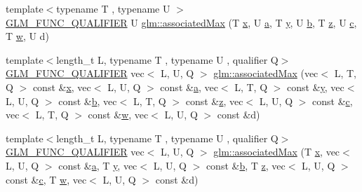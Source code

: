 \begin{DoxyCompactItemize}
\item 
{\footnotesize template$<$typename T , typename U $>$ }\\\mbox{\hyperlink{setup_8hpp_a33fdea6f91c5f834105f7415e2a64407}{G\+L\+M\+\_\+\+F\+U\+N\+C\+\_\+\+Q\+U\+A\+L\+I\+F\+I\+ER}} U \mbox{\hyperlink{group__gtx__associated__min__max_ga3038ffcb43eaa6af75897a99a5047ccc}{glm\+::associated\+Max}} (T \mbox{\hyperlink{_s_d_l__opengl_8h_ad0e63d0edcdbd3d79554076bf309fd47}{x}}, U \mbox{\hyperlink{_s_d_l__opengl__glext_8h_a3309789fc188587d666cda5ece79cf82}{a}}, T \mbox{\hyperlink{_s_d_l__opengl_8h_a1675d9d7bb68e1657ff028643b4037e3}{y}}, U \mbox{\hyperlink{_s_d_l__opengl__glext_8h_a0f71581a41fd2264c8944126dabbd010}{b}}, T \mbox{\hyperlink{_s_d_l__opengl__glext_8h_a5e74030ebb3297ce1b37ff716fedd68f}{z}}, U \mbox{\hyperlink{_s_d_l__opengl__glext_8h_a1f2d7f8147412c43ba2303a56f97ee73}{c}}, T \mbox{\hyperlink{_s_d_l__opengl__glext_8h_a6ee8f168a7ab6785a9bb57c6715dad99}{w}}, U d)
\item 
{\footnotesize template$<$length\+\_\+t L, typename T , typename U , qualifier Q$>$ }\\\mbox{\hyperlink{setup_8hpp_a33fdea6f91c5f834105f7415e2a64407}{G\+L\+M\+\_\+\+F\+U\+N\+C\+\_\+\+Q\+U\+A\+L\+I\+F\+I\+ER}} vec$<$ L, U, Q $>$ \mbox{\hyperlink{group__gtx__associated__min__max_gaf5ab0c428f8d1cd9e3b45fcfbf6423a6}{glm\+::associated\+Max}} (vec$<$ L, T, Q $>$ const \&\mbox{\hyperlink{_s_d_l__opengl_8h_ad0e63d0edcdbd3d79554076bf309fd47}{x}}, vec$<$ L, U, Q $>$ const \&\mbox{\hyperlink{_s_d_l__opengl__glext_8h_a3309789fc188587d666cda5ece79cf82}{a}}, vec$<$ L, T, Q $>$ const \&\mbox{\hyperlink{_s_d_l__opengl_8h_a1675d9d7bb68e1657ff028643b4037e3}{y}}, vec$<$ L, U, Q $>$ const \&\mbox{\hyperlink{_s_d_l__opengl__glext_8h_a0f71581a41fd2264c8944126dabbd010}{b}}, vec$<$ L, T, Q $>$ const \&\mbox{\hyperlink{_s_d_l__opengl__glext_8h_a5e74030ebb3297ce1b37ff716fedd68f}{z}}, vec$<$ L, U, Q $>$ const \&\mbox{\hyperlink{_s_d_l__opengl__glext_8h_a1f2d7f8147412c43ba2303a56f97ee73}{c}}, vec$<$ L, T, Q $>$ const \&\mbox{\hyperlink{_s_d_l__opengl__glext_8h_a6ee8f168a7ab6785a9bb57c6715dad99}{w}}, vec$<$ L, U, Q $>$ const \&d)
\item 
{\footnotesize template$<$length\+\_\+t L, typename T , typename U , qualifier Q$>$ }\\\mbox{\hyperlink{setup_8hpp_a33fdea6f91c5f834105f7415e2a64407}{G\+L\+M\+\_\+\+F\+U\+N\+C\+\_\+\+Q\+U\+A\+L\+I\+F\+I\+ER}} vec$<$ L, U, Q $>$ \mbox{\hyperlink{group__gtx__associated__min__max_ga11477c2c4b5b0bfd1b72b29df3725a9d}{glm\+::associated\+Max}} (T \mbox{\hyperlink{_s_d_l__opengl_8h_ad0e63d0edcdbd3d79554076bf309fd47}{x}}, vec$<$ L, U, Q $>$ const \&\mbox{\hyperlink{_s_d_l__opengl__glext_8h_a3309789fc188587d666cda5ece79cf82}{a}}, T \mbox{\hyperlink{_s_d_l__opengl_8h_a1675d9d7bb68e1657ff028643b4037e3}{y}}, vec$<$ L, U, Q $>$ const \&\mbox{\hyperlink{_s_d_l__opengl__glext_8h_a0f71581a41fd2264c8944126dabbd010}{b}}, T \mbox{\hyperlink{_s_d_l__opengl__glext_8h_a5e74030ebb3297ce1b37ff716fedd68f}{z}}, vec$<$ L, U, Q $>$ const \&\mbox{\hyperlink{_s_d_l__opengl__glext_8h_a1f2d7f8147412c43ba2303a56f97ee73}{c}}, T \mbox{\hyperlink{_s_d_l__opengl__glext_8h_a6ee8f168a7ab6785a9bb57c6715dad99}{w}}, vec$<$ L, U, Q $>$ const \&d)

\end{DoxyCompactItemize}
